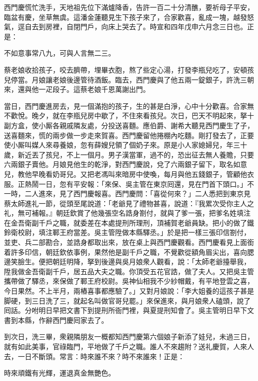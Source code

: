 西門慶慌忙洗手，天地祖先位下滿爐降香，告許一百二十分清醮，要祈母子平安，臨盆有慶，坐草無虞。{}這潘金蓮聽見生下孩子來了，合家歡喜，亂成一塊，越發怒氣，逕自去到房裡，自閉門戶，向床上哭去了。{}時宣和四年戊申六月念三日也。正是：

\begin{myquote}
不如意事常八九，可與人言無二三。
\end{myquote}

蔡老娘收拾孩子，咬去臍帶，埋畢衣胞，熬了些定心湯，打發李瓶兒吃了，安頓孩兒停當。月娘讓老娘後邊管待酒飯。臨去，西門慶與了他五兩一錠銀子，許洗三朝來，還與他一疋段子。這蔡老娘千恩萬謝出門。

當日，西門慶進房去，見一個滿抱的孩子，生的甚是白淨，心中十分歡喜。合家無不歡悅。晚夕，就在李瓶兒房中歇了，不住來看孩兒。次日，巴天不明起來，拏十副方盒，使小厮各親戚隣友處，分投送喜麵。應伯爵、謝希大聽見西門慶生了子，送喜麵來，慌的兩步做一步走來賀喜。西門慶留他捲棚內吃麵。剛打發去了，正要使小厮叫媒人來尋養娘，忽有薛嫂兒領了個奶子來。原是小人家媳婦兒，年三十歲，新近丟了孩兒，不上一個月。男子漢當軍，過不的，恐出征去無人養贍，只要六兩銀子賣他。月娘見他生的乾淨，{}對西門慶說，兌了六兩銀子留下，取名如意兒，教他早晚看奶哥兒。又把老馮叫來暗房中使喚，每月與他五錢銀子，管顧他衣服。正熱鬧一日，忽有平安報：「來保、吳主管在東京囘還，見在門首下頭口。」不一時，二人進來，見了西門慶報喜。西門慶問：「喜從何來？」二人悉把到東京見蔡太師進礼一節，從頭至尾說道：「老爺見了禮物甚喜，說道：『我累次受你主人之礼，無可補報。』朝廷欽賞了他幾張空名誥身劄付，就與了爹一張，把爹名姓填注在金吾衛副千戶之職，就委差在本處提刑所理刑，頂補賀老爺員缺。把小的做了鐵鈴衛校尉，填注鄆王府當差。吳主管陞做本縣驛丞。」於是把一樣三張印信劄付，並吏、兵二部勘合，並誥身都取出來，放在桌上與西門慶觀看。西門慶看見上面銜着許多印信，朝廷欽依事例，果然他是副千戶之職，不覺歡從額角眉尖出，喜向腮邊笑臉生。便把朝廷明降，拏到後邊與吳月娘衆人觀看，說：「太師老爺擡舉我，陞我做金吾衛副千戶，居五品大夫之職。你頂受五花官誥，做了夫人。又把吳主管攜帶做了驛丞，來保做了鄆王府校尉。吳神仙相我不少紗帽戴，有平地登雲之喜，今日果然。不上半月，兩樁喜事都應驗了。」又對月娘說：「李大姐養的這孩子甚是脚硬，到三日洗了三，就起名叫做官哥兒罷。」來保進來，與月娘衆人磕頭，說了囘話。分咐明日早把文書下到提刑所衙門裡，與夏提刑知會了。吳主管明日早下文書到本縣，作辭西門慶囘家去了。

到次日，洗三畢，衆親隣朋友一概都知西門慶第六個娘子新添了娃兒，未過三日，就有如此美事，官祿臨門，平地做了千戶之職。誰人不來趨附？送礼慶賀，人來人去，一日不斷頭。常言：時來誰不來？時不來誰來！正是：

\begin{myquote}
時來頑鐵有光輝，運退真金無艷色。
\end{myquote}

